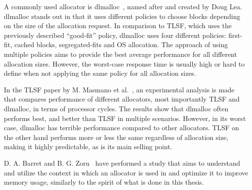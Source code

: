 

A commonly used allocator is dlmalloc~\cite{dlmalloc}, named after and created by Doug Lea. dlmalloc stands out in that it uses different policies to choose blocks depending on the size of the allocation request. In comparison to TLSF, which uses the previously described ``good-fit'' policy, dlmalloc uses four different policies: first-fit, cached blocks, segregated-fits and OS allocation. The approach of using multiple policies aims to provide the best average performance for all different allocation sizes. However, the worst-case response time is usually high or hard to define when not applying the same policy for all allocation sizes.

In the TLSF paper by M. Masmano et al.~\cite{TLSF}, an experimental analysis is made that compares performance of different allocators, most importantly TLSF and dlmalloc, in terms of processor cycles. The results show that dlmalloc often performs best, and better than TLSF in multiple scenarios. However, in its worst case, dlmalloc has terrible performance compared to other allocators. TLSF on the other hand performs more or less the same regardless of allocation size, making it highly predictable, as is its main selling point.



\newpage

D. A. Barret and B. G. Zorn~\cite{lifetime_predictors_memalloc} have performed a study that aims to understand and utilize the context in which an allocator is used in and optimize it to improve memory usage, similarly to the spirit of what is done in this thesis. 

